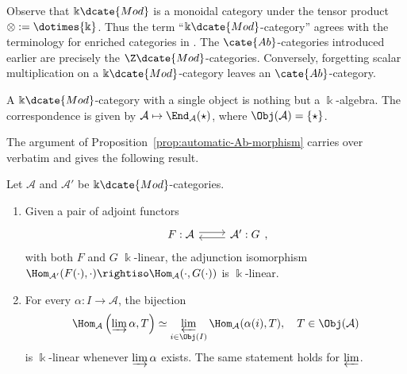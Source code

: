 Observe that $\Bbbk\dcate{Mod}$ is a monoidal category under the tensor product
$\otimes := \dotimes{\Bbbk}$. Thus the term ``$\Bbbk\dcate{Mod}$-category''
agrees with the terminology for enriched categories in \cite[\S 3.4]{Li1}.
The $\cate{Ab}$-categories introduced earlier are precisely the
$\Z\dcate{Mod}$-categories. Conversely, forgetting scalar multiplication on a
$\Bbbk\dcate{Mod}$-category leaves an $\cate{Ab}$-category.

\begin{example}
	A $\Bbbk\dcate{Mod}$-category with a single object is nothing but a
	$\Bbbk$-algebra. The correspondence is given by
	$\mathcal{A} \mapsto \End_{\mathcal{A}}(\star)$, where
	$\Obj(\mathcal{A}) = \{\star\}$.
\end{example}

The argument of Proposition~\ref{prop:automatic-Ab-morphism} carries over
verbatim and gives the following result.

\begin{proposition}\label{prop:automatic-k-morphism}
	Let $\mathcal{A}$ and $\mathcal{A}'$ be $\Bbbk\dcate{Mod}$-categories.
	\begin{enumerate}
		\item Given a pair of adjoint functors
		\[
		\begin{tikzcd}
			F: \mathcal{A} \arrow[shift left, r] & \mathcal{A}' \arrow[shift left, l] : G
		\end{tikzcd},
		\]
		with both $F$ and $G$ $\Bbbk$-linear, the adjunction isomorphism
		$\Hom_{\mathcal{A}'}(F(\cdot),\cdot) \rightiso
		\Hom_{\mathcal{A}}(\cdot,G(\cdot))$ is $\Bbbk$-linear.
		\item For every $\alpha: I \to \mathcal{A}$, the bijection
		\[
			\Hom_{\mathcal{A}}\left(\varinjlim \alpha,T\right)
			\simeq \varprojlim_{i \in \Obj(I)}
			\Hom_{\mathcal{A}}(\alpha(i),T),
			\quad T \in \Obj(\mathcal{A})
		\]
		is $\Bbbk$-linear whenever $\varinjlim \alpha$ exists. The same statement
		holds for $\varprojlim$.
	\end{enumerate}
\end{proposition}

